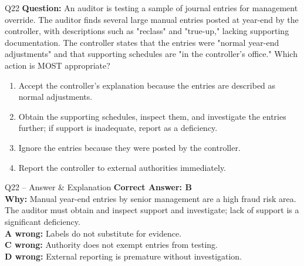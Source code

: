 \documentclass[aspectratio=169,10pt]{beamer}
\begin{document}
	\begin{frame}[t]{Q22}
		\small
		\textbf{Question:} An auditor is testing a sample of journal entries for management override. The auditor finds several large manual entries posted at year-end by the controller, with descriptions such as "reclass" and "true-up," lacking supporting documentation. The controller states that the entries were "normal year-end adjustments" and that supporting schedules are "in the controller's office." Which action is MOST appropriate?
		\begin{enumerate}[label=\Alph*.,itemsep=1pt,topsep=2pt]
			\item Accept the controller's explanation because the entries are described as normal adjustments.
			\item Obtain the supporting schedules, inspect them, and investigate the entries further; if support is inadequate, report as a deficiency.
			\item Ignore the entries because they were posted by the controller.
			\item Report the controller to external authorities immediately.
		\end{enumerate}
	\end{frame}
	
	\begin{frame}[t]{Q22 -- Answer \& Explanation}
		\small
		\textbf{Correct Answer: B} \\[4pt]
		\textbf{Why:} Manual year-end entries by senior management are a high fraud risk area. The auditor must obtain and inspect support and investigate; lack of support is a significant deficiency. \\[4pt]
		\textbf{A wrong:} Labels do not substitute for evidence. \\[2pt]
		\textbf{C wrong:} Authority does not exempt entries from testing. \\[2pt]
		\textbf{D wrong:} External reporting is premature without investigation.
	\end{frame}
	
\end{document}
